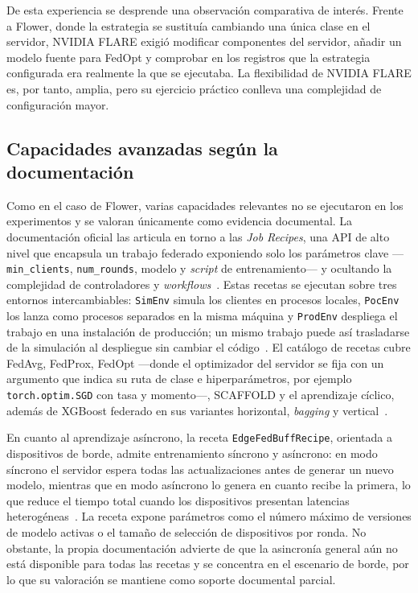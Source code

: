 De esta experiencia se desprende una observación comparativa de interés. Frente a
Flower, donde la estrategia se sustituía cambiando una única clase en el servidor,
NVIDIA FLARE exigió modificar componentes del servidor, añadir un modelo fuente para
FedOpt y comprobar en los registros que la estrategia configurada era realmente la
que se ejecutaba. La flexibilidad de NVIDIA FLARE es, por tanto, amplia, pero su
ejercicio práctico conlleva una complejidad de configuración mayor.

\subsection{Capacidades avanzadas según la documentación}\label{subsec:flex-nvflare-doc}

Como en el caso de Flower, varias capacidades relevantes no se ejecutaron en los
experimentos y se valoran únicamente como evidencia documental. La documentación
oficial las articula en torno a las \textit{Job Recipes}, una API de alto nivel que
encapsula un trabajo federado exponiendo solo los parámetros clave —\texttt{min\_clients},
\texttt{num\_rounds}, modelo y \textit{script} de entrenamiento— y ocultando la
complejidad de controladores y \textit{workflows}~\parencite{nvflareRecipes}. Estas
recetas se ejecutan sobre tres entornos intercambiables: \texttt{SimEnv} simula los
clientes en procesos locales, \texttt{PocEnv} los lanza como procesos separados en la
misma máquina y \texttt{ProdEnv} despliega el trabajo en una instalación de
producción; un mismo trabajo puede así trasladarse de la simulación al despliegue sin
cambiar el código~\parencite{nvflareRecipes}. El catálogo de recetas cubre FedAvg,
FedProx, FedOpt —donde el optimizador del servidor se fija con un argumento que indica
su ruta de clase e hiperparámetros, por ejemplo \texttt{torch.optim.SGD} con tasa y
momento—, SCAFFOLD y el aprendizaje cíclico, además de XGBoost federado en sus
variantes horizontal, \textit{bagging} y vertical~\parencite{nvflareAlgorithms,nvflareFedopt}.

En cuanto al aprendizaje asíncrono, la receta \texttt{EdgeFedBuffRecipe}, orientada a
dispositivos de borde, admite entrenamiento síncrono y asíncrono: en modo síncrono el
servidor espera todas las actualizaciones antes de generar un nuevo modelo, mientras
que en modo asíncrono lo genera en cuanto recibe la primera, lo que reduce el tiempo
total cuando los dispositivos presentan latencias heterogéneas~\parencite{nvflareEdge,nvflareWelcome}.
La receta expone parámetros como el número máximo de versiones de modelo activas o el
tamaño de selección de dispositivos por ronda. No obstante, la propia documentación
advierte de que la asincronía general aún no está disponible para todas las recetas y
se concentra en el escenario de borde, por lo que su valoración se mantiene como
soporte documental parcial.

